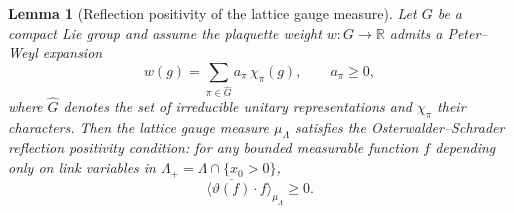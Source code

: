 \documentclass[12pt,a4paper]{article}
\theoremstyle{definition}
\theoremstyle{plain}
\newtheorem{lemma}[definition]{Lemma}
\theoremstyle{remark}
\begin{document}
\begin{lemma}[Reflection positivity of the lattice gauge measure]
\label{lem:reflection-positivity}
Let $G$ be a compact Lie group and assume the plaquette weight $w: G \to \mathbb{R}$ admits a Peter--Weyl expansion
\begin{equation}\label{eq:PW-coefficients}
    w(g) = \sum_{\pi \in \widehat{G}} a_\pi\,\chi_\pi(g), \qquad a_\pi \geq 0,
\end{equation}
where $\widehat{G}$ denotes the set of irreducible unitary representations and $\chi_\pi$ their characters.  Then the lattice gauge measure $\mu_\Lambda$ satisfies the Osterwalder--Schrader reflection positivity condition: for any bounded measurable function $f$ depending only on link variables in $\Lambda_+ = \Lambda \cap \{x_0 > 0\}$,
\begin{equation}
    \langle \overline{\vartheta(f)} \cdot f \rangle_{\mu_\Lambda} \geq 0.
\end{equation}
\end{lemma}
\end{document}
